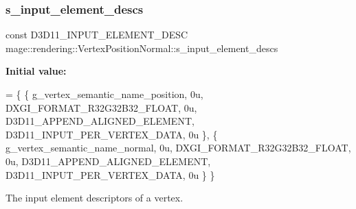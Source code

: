 \subsubsection{\texorpdfstring{s\+\_\+input\+\_\+element\+\_\+descs}{s\_input\_element\_descs}}
{\footnotesize\ttfamily const D3\+D11\+\_\+\+I\+N\+P\+U\+T\+\_\+\+E\+L\+E\+M\+E\+N\+T\+\_\+\+D\+E\+SC mage\+::rendering\+::\+Vertex\+Position\+Normal\+::s\+\_\+input\+\_\+element\+\_\+descs\hspace{0.3cm}{\ttfamily [static]}}

{\bfseries Initial value\+:}
\begin{DoxyCode}
= \{
        \{ g\_vertex\_semantic\_name\_position, 0u, DXGI\_FORMAT\_R32G32B32\_FLOAT,    0u, 
      D3D11\_APPEND\_ALIGNED\_ELEMENT, D3D11\_INPUT\_PER\_VERTEX\_DATA, 0u \},
        \{ g\_vertex\_semantic\_name\_normal,   0u, DXGI\_FORMAT\_R32G32B32\_FLOAT,    0u, 
      D3D11\_APPEND\_ALIGNED\_ELEMENT, D3D11\_INPUT\_PER\_VERTEX\_DATA, 0u \}
    \}
\end{DoxyCode}
The input element descriptors of a vertex. 